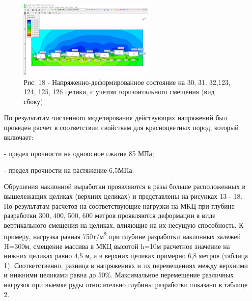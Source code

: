 \begin{figure}[H]
	\centering
	\includegraphics[width=0.6\textwidth]{media/gor/image21}
	\caption*{Рис. 18 - Напряженно-деформированное состояние на 30, 31,
	32,123, 124, 125, 126 целики, с учетом горизонтального смещения (вид сбоку)}
\end{figure}

\begin{multicols}{2}
По результатам численного моделирования действующих напряжений был
проведен расчет в соответствии свойствам для красноцветных пород,
который включает:

- предел прочности на одноосное сжатие 85 МПа;

- предел прочности на растяжение 6,5МПа.

Обрушения наклонной выработки проявляются в разы больше расположенных в
вышележащих целиках (верхних целиках) и представлены на рисунках 13 -
18. По результатам расчетов на соответствующие нагрузки на МКЦ при
глубине разработки 300, 400, 500, 600 метров проявляются деформации в
виде вертикального смещения на целиках, влияющие на их несущую
способность. К примеру, нагрузка равная 750т/м\textsuperscript{2} при
глубине разработки наклонных залежей H=300м, смещение массива в МКЦ
высотой h=10м расчетное значение на нижних целиках равно 4,5 м, а в
верхних целиках примерно 6,8 метров (таблица 1). Соответственно, разница
в напряжениях и их перемещениях между верхними и нижними целиками равна
до 50\%. Максимальное перемещение различных нагрузок при выемке руды
относительно глубины разработки показано в таблице 2.
\end{multicols}

